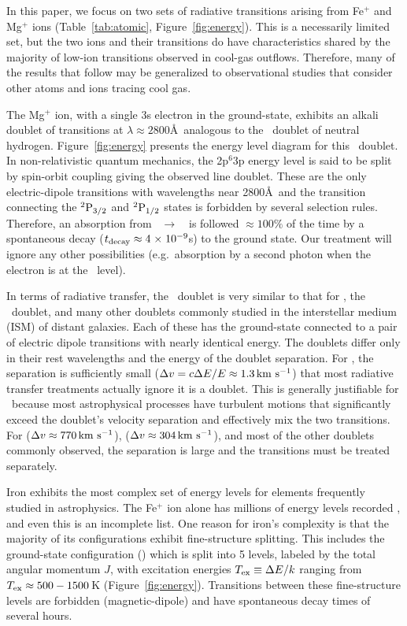 \documentclass[12pt,preprint]{aastex}
\begin{document}
In this paper, we focus on two sets of radiative transitions
arising from Fe$^+$ and Mg$^+$ ions
(Table~\ref{tab:atomic}, Figure~\ref{fig:energy}).
This is a necessarily limited
set, but the two ions and their transitions do have characteristics
shared by the majority of low-ion transitions
observed in cool-gas outflows. Therefore, many
of the results that follow may be generalized to observational studies that
consider other atoms and ions tracing cool gas.

The Mg$^+$ ion, with a single 3s electron in the ground-state,
exhibits an alkali doublet of transitions at $\lambda \approx
2800$\AA\ analogous to the
\lya\ doublet of neutral hydrogen.  Figure~\ref{fig:energy}
presents the energy level diagram for this 
\mgiid\ doublet.  In non-relativistic quantum
mechanics, the 2p$^6$3p energy level is said to be split by spin-orbit
coupling giving the observed line doublet.  These are the only
 electric-dipole transitions 
with wavelengths near 2800\AA\ and the transition connecting
the $\rm {}^2P_{3/2}$ and $\rm {}^2P_{1/2}$ states is forbidden by several
selection rules.  Therefore, an absorption from
\maconfig~$\to$~\mbconfig\
is followed $\approx 100\%$ of the time by a spontaneous decay
($t_{\rm decay} \approx 4{\; \times \; 10^{-9}}$s) to the
ground state. Our treatment will ignore any other possibilities
(e.g.\ absorption by a second photon when the electron is at the \mbconfig\ level).

In terms of radiative transfer, the 
\mgiid\ doublet is very similar to that for 
\lya, the \naid\ doublet, and many other doublets commonly
studied in the interstellar medium (ISM) of distant galaxies.  
Each of these has the ground-state connected to a pair of electric
dipole transitions with nearly identical energy.
The doublets differ only in 
their rest wavelengths and the energy of the doublet separation. 
For \ion{H}{1} \lya, the
separation is sufficiently small ($\Delta v = c \Delta E / E \approx
1.3 \, {\rm km~s^{-1}}$) that most radiative transfer treatments actually ignore it
is a doublet.
This is generally justifiable for \lya\ because 
most astrophysical processes have turbulent motions that
significantly exceed the doublet's velocity separation and effectively mix the
two transitions.  For \ion{Mg}{2} ($\Delta v \approx 770 \, {\rm km~s^{-1}}$),  
\ion{Na}{1} ($\Delta v \approx 304 \, {\rm km~s^{-1}}$), and most of the other doublets
commonly observed, the separation is large and the transitions
must be treated separately.  

Iron exhibits the most complex set of energy levels for elements
frequently studied in astrophysics.  The Fe$^+$ ion alone has 
millions of energy levels recorded \citep{kurucz05}, and even this is an
incomplete list.  
One reason for iron's complexity is
that the majority of its configurations exhibit fine-structure splitting.
This includes the ground-state configuration (\aconfig) which is split
into 5 levels, 
labeled by the total angular momentum $J$, 
with excitation energies $T_{\rm ex} \equiv \Delta E / k$ ranging from
$T_{\rm ex} \approx 500-1500$\,K (Figure~\ref{fig:energy}).  
Transitions between these fine-structure levels are 
forbidden (magnetic-dipole) and have spontaneous decay times of several hours.  
\end{document}

